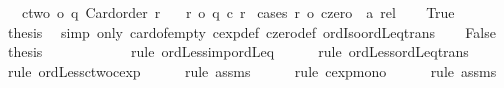 \begin{isabellebody}
\ \ \ {\isachardoublequoteopen}ctwo\ {\isasymle}o\ q{\isachardoublequoteclose}\ {\isachardoublequoteopen}Card{\isacharunderscore}{\kern0pt}order\ r{\isachardoublequoteclose}\isanewline
\ \ \ {\isachardoublequoteopen}r\ {\isasymle}o\ q\ {\isacharcircum}{\kern0pt}c\ r{\isachardoublequoteclose}\isanewline
%
\isadelimproof
%
\endisadelimproof
%
\isatagproof
{}\isamarkupfalse%
\ {\isacharparenleft}{\kern0pt}cases\ {\isachardoublequoteopen}r\ {\isacharequal}{\kern0pt}o\ {\isacharparenleft}{\kern0pt}czero\ {\isacharcolon}{\kern0pt}{\isacharcolon}{\kern0pt}\ {\isacharprime}{\kern0pt}a\ rel{\isacharparenright}{\kern0pt}{\isachardoublequoteclose}{\isacharparenright}{\kern0pt}\isanewline
\ \ \isamarkupfalse%
\ True\ \isamarkupfalse%
\ {\isacharquery}{\kern0pt}thesis\ \isamarkupfalse%
\ {\isacharparenleft}{\kern0pt}simp\ only{\isacharcolon}{\kern0pt}\ card{\isacharunderscore}{\kern0pt}of{\isacharunderscore}{\kern0pt}empty\ cexp{\isacharunderscore}{\kern0pt}def\ czero{\isacharunderscore}{\kern0pt}def\ ordIso{\isacharunderscore}{\kern0pt}ordLeq{\isacharunderscore}{\kern0pt}trans{\isacharparenright}{\kern0pt}\isanewline
{}\isamarkupfalse%
\isanewline
\ \ \isamarkupfalse%
\ False\ \isamarkupfalse%
\ {\isacharquery}{\kern0pt}thesis\isanewline
\ \ \ \ \isamarkupfalse%
\ {\isacharminus}{\kern0pt}\isanewline
\ \ \ \ \isamarkupfalse%
\ {\isacharparenleft}{\kern0pt}rule\ ordLess{\isacharunderscore}{\kern0pt}imp{\isacharunderscore}{\kern0pt}ordLeq{\isacharparenright}{\kern0pt}\isanewline
\ \ \ \ \isamarkupfalse%
\ {\isacharparenleft}{\kern0pt}rule\ ordLess{\isacharunderscore}{\kern0pt}ordLeq{\isacharunderscore}{\kern0pt}trans{\isacharparenright}{\kern0pt}\isanewline
\ \ \ \ \isamarkupfalse%
\ {\isacharparenleft}{\kern0pt}rule\ ordLess{\isacharunderscore}{\kern0pt}ctwo{\isacharunderscore}{\kern0pt}cexp{\isacharparenright}{\kern0pt}\isanewline
\ \ \ \ \isamarkupfalse%
\ {\isacharparenleft}{\kern0pt}rule\ assms{\isacharparenleft}{\kern0pt}{}{\isacharparenright}{\kern0pt}{\isacharparenright}{\kern0pt}\isanewline
\ \ \ \ \isamarkupfalse%
\ {\isacharparenleft}{\kern0pt}rule\ cexp{\isacharunderscore}{\kern0pt}mono{}{\isacharparenright}{\kern0pt}\isanewline
\ \ \ \ \isamarkupfalse%
\ {\isacharparenleft}{\kern0pt}rule\ assms{\isacharparenleft}{\kern0pt}{}{\isacharparenright}{\kern0pt}{\isacharparenright}{\kern0pt}\isanewline

\end{isabellebody}
